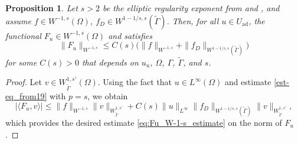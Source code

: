 \documentclass[11pt]{article}
\newcommand{\feas}{U_{\textrm{ad}}}
\newtheorem{proposition}[theorem]{Proposition}
\theoremstyle{definition}
\theoremstyle{remark}
\begin{document}
\begin{proposition}\label{prop:Fu_W-1-s}
Let $s>2$ be the elliptic regularity exponent from
\cite{groger1989aw} and \cite{clason2018total}, and assume
$f \in W^{-1,s}(\Omega)$, $f_D \in W^{1-1/s,s}(\tilde\Gamma)$.
Then, for all $u\in\feas$, the functional $F_u \in  W^{-1,s}(\Omega)$ and satisfies
%
\begin{equation}\label{eq:Fu_W-1-s_estimate}
\|F_u\|_{W^{-1,s}}
\le
C(s)\bigl(\|f\|_{W^{-1,s}} + \|f_D\|_{W^{1-1/s,s}(\tilde\Gamma)}\bigr)
\end{equation}
%
for some $C(s) > 0$ that depends on $u_u$, $\Omega$, $\Gamma$, $\tilde{\Gamma}$, and $s$.
\end{proposition}
\begin{proof}
Let $v\in W^{1,s'}_{\tilde\Gamma}(\Omega)$. Using the fact that $u\in L^\infty(\Omega)$ and estimate \eqref{est-eq_from19} with $p=s$, we obtain
\[ |\langle F_u , v\rangle | \leq \|f\|_{W^{-1,s}}\|v\|_{W^{1,s'}_{\tilde\Gamma}}+ C(s)
\|u\|_{L^\infty}\|f_D\|_{W^{1-1/s,s}(\tilde\Gamma)}\|v\|_{W^{1,s'}_{\tilde\Gamma}},
\]
which provides the desired estimate  \eqref{eq:Fu_W-1-s_estimate} on the norm of $F_u$. 
\end{proof}
\end{document}
